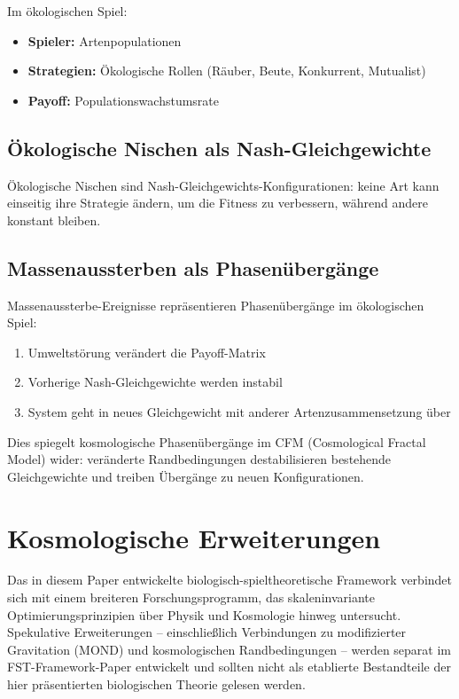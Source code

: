 \documentclass[12pt,a4paper]{article}
\theoremstyle{remark}
\begin{document}
Im \"okologischen Spiel:
\begin{itemize}
    \item \textbf{Spieler:} Artenpopulationen
    \item \textbf{Strategien:} \"Okologische Rollen (R\"auber, Beute, Konkurrent, Mutualist)
    \item \textbf{Payoff:} Populationswachstumsrate
\end{itemize}

\subsection{\"Okologische Nischen als Nash-Gleichgewichte}

\"Okologische Nischen sind Nash-Gleichgewichts-Konfigurationen: keine Art kann einseitig ihre Strategie \"andern, um die Fitness zu verbessern, w\"ahrend andere konstant bleiben.

\subsection{Massenaussterben als Phasen\"uberg\"ange}

Massenaussterbe-Ereignisse repr\"asentieren Phasen\"uberg\"ange im \"okologischen Spiel:
\begin{enumerate}
    \item Umweltst\"orung ver\"andert die Payoff-Matrix
    \item Vorherige Nash-Gleichgewichte werden instabil
    \item System geht in neues Gleichgewicht mit anderer Artenzusammensetzung \"uber
\end{enumerate}

Dies spiegelt kosmologische Phasen\"uberg\"ange im CFM (Cosmological Fractal Model) wider: ver\"anderte Randbedingungen destabilisieren bestehende Gleichgewichte und treiben \"Uberg\"ange zu neuen Konfigurationen.

\section{Kosmologische Erweiterungen}
\label{sec:cosmology}

Das in diesem Paper entwickelte biologisch-spieltheoretische Framework verbindet sich mit einem breiteren Forschungsprogramm, das skaleninvariante Optimierungsprinzipien \"uber Physik und Kosmologie hinweg untersucht. Spekulative Erweiterungen -- einschlie\ss{}lich Verbindungen zu modifizierter Gravitation (MOND) und kosmologischen Randbedingungen -- werden separat im FST-Framework-Paper \citep{FST-Unified2026} entwickelt und sollten nicht als etablierte Bestandteile der hier pr\"asentierten biologischen Theorie gelesen werden.
\end{document}
